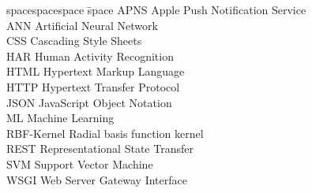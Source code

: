 
\begin{tabbing}
spacespacespace \= space \kill
APNS \> Apple Push Notification Service \\
ANN	 \> 	Artificial Neural Network	 \\
CSS	 \> 	Cascading Style Sheets	 \\
HAR	 \> 	Human Activity Recognition	 \\
HTML	 \> 	Hypertext Markup Language	 \\
HTTP \> Hypertext Transfer Protocol \\
JSON \> JavaScript Object Notation \\
ML	 \> 	Machine Learning	 \\
RBF-Kernel \> Radial basis function kernel \\
REST \> Representational State Transfer \\
SVM	 \> 	Support Vector Machine	 \\
WSGI \> Web Server Gateway Interface \\
\end{tabbing}
\endinput
